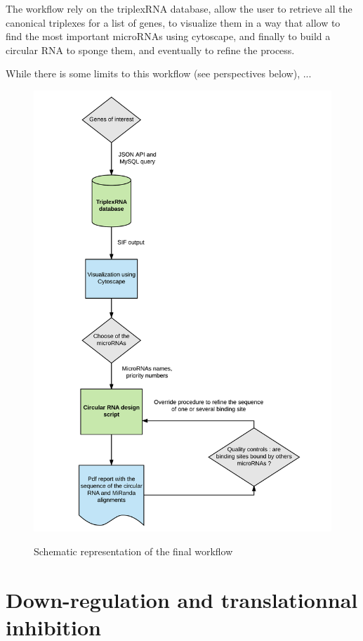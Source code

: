 \documentclass[a4paper,12pt]{report}
\begin{document}
The workflow rely on the triplexRNA database, allow the user to retrieve all the canonical triplexes for a list of genes, to visualize them in a way that allow to find the most important microRNAs using cytoscape, and finally to build a circular RNA to sponge them, and eventually to refine the process. 



While there is some limits to this workflow (see perspectives below), ...


\begin{figure}[H]
	\centering
	{\includegraphics[width=1\textwidth]{Final_Workflow.png}}
	\caption{Schematic representation of the final workflow}
\end{figure}

\section{Down-regulation and translationnal inhibition}
\end{document}
